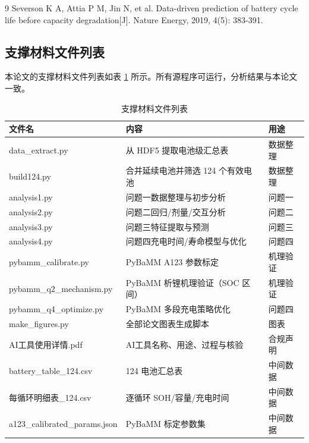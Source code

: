 \documentclass[withoutpreface]{cumcmthesis}
\begin{document}
\begin{thebibliography}{9}
 Severson K A, Attia P M, Jin N, et al. Data-driven prediction of battery cycle life before capacity degradation[J]. Nature Energy, 2019, 4(5): 383-391.
\end{thebibliography}

\newpage

\begin{appendices}

\section{支撑材料文件列表}

本论文的支撑材料文件列表如表 \ref{tab:support} 所示。所有源程序可运行，分析结果与本论文一致。

\begin{table}[htbp]
\centering
\caption{支撑材料文件列表}
\label{tab:support}
\begin{tabular}{lll}
\toprule
文件名 & 内容 & 用途 \\
\midrule
data\_extract.py & 从 HDF5 提取电池级汇总表 & 数据整理 \\
build124.py & 合并延续电池并筛选 124 个有效电池 & 数据整理 \\
analysis1.py & 问题一数据整理与初步分析 & 问题一 \\
analysis2.py & 问题二回归/剂量/交互分析 & 问题二 \\
analysis3.py & 问题三特征提取与预测 & 问题三 \\
analysis4.py & 问题四充电时间/寿命模型与优化 & 问题四 \\
pybamm\_calibrate.py & PyBaMM A123 参数标定 & 机理验证 \\
pybamm\_q2\_mechanism.py & PyBaMM 析锂机理验证（SOC 区间） & 机理验证 \\
pybamm\_q4\_optimize.py & PyBaMM 多段充电策略优化 & 问题四 \\
make\_figures.py & 全部论文图表生成脚本 & 图表 \\
AI工具使用详情.pdf & AI工具名称、用途、过程与核验 & 合规声明 \\
battery\_table\_124.csv & 124 电池汇总表 & 中间数据 \\
每循环明细表\_124.csv & 逐循环 SOH/容量/充电时间 & 中间数据 \\
a123\_calibrated\_params.json & PyBaMM 标定参数集 & 中间数据 \\
\bottomrule
\end{tabular}
\end{table}


\end{appendices}
\end{document}
